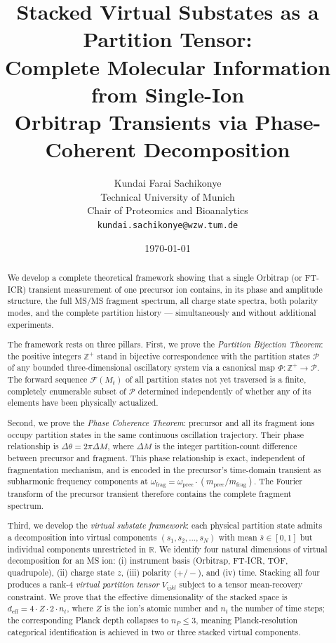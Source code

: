 \documentclass[twocolumn,10pt,a4paper]{article}
\title{\textbf{Stacked Virtual Substates as a Partition Tensor:\\
Complete Molecular Information from Single-Ion\\
Orbitrap Transients via Phase-Coherent Decomposition}}
\author{
Kundai Farai Sachikonye\\
Technical University of Munich\\
Chair of Proteomics and Bioanalytics\\
\texttt{kundai.sachikonye@wzw.tum.de}
}
\date{\today}
\theoremstyle{thmstyle}
\theoremstyle{definition}
\theoremstyle{remark}
\newcommand{\R}{\mathbb{R}}
\newcommand{\Zp}{\mathbb{Z}^{+}}
\newcommand{\Parts}{\mathcal{P}}
\newcommand{\PhiMap}{\varPhi}
\newcommand{\calF}{\mathcal{F}}
\begin{document}
\maketitle

\begin{abstract}
\noindent
We develop a complete theoretical framework showing that a single
Orbitrap (or FT-ICR) transient measurement of one precursor ion
contains, in its phase and amplitude structure, the full MS/MS fragment
spectrum, all charge state spectra, both polarity modes, and the
complete partition history --- simultaneously and without additional
experiments.

The framework rests on three pillars. First, we prove the
\emph{Partition Bijection Theorem}: the positive integers $\Zp$ stand
in bijective correspondence with the partition states $\Parts$ of any
bounded three-dimensional oscillatory system via a canonical map
$\PhiMap: \Zp \to \Parts$. The forward sequence $\calF(M_t)$ of all
partition states not yet traversed is a finite, completely enumerable
subset of $\Parts$ determined independently of whether any of its
elements have been physically actualized.

Second, we prove the \emph{Phase Coherence Theorem}: precursor and all
its fragment ions occupy partition states in the same continuous
oscillation trajectory. Their phase relationship is $\Delta\theta =
2\pi\Delta M$, where $\Delta M$ is the integer partition-count
difference between precursor and fragment. This phase relationship is
exact, independent of fragmentation mechanism, and is encoded in the
precursor's time-domain transient as subharmonic frequency components
at $\omega_{\mathrm{frag}} = \omega_{\mathrm{prec}} \cdot
(m_{\mathrm{prec}}/m_{\mathrm{frag}})$. The Fourier transform of the
precursor transient therefore contains the complete fragment spectrum.

Third, we develop the \emph{virtual substate framework}: each physical
partition state admits a decomposition into virtual components
$(s_1, s_2, \ldots, s_N)$ with mean $\bar{s} \in [0,1]$ but individual
components unrestricted in $\R$. We identify four natural dimensions of
virtual decomposition for an MS ion: (i) instrument basis (Orbitrap,
FT-ICR, TOF, quadrupole), (ii) charge state $z$, (iii) polarity
($+/-$), and (iv) time. Stacking all four produces a rank-4
\emph{virtual partition tensor} $V_{ijkl}$ subject to a tensor
mean-recovery constraint. We prove that the effective dimensionality of
the stacked space is $d_{\mathrm{eff}} = 4 \cdot Z \cdot 2 \cdot n_t$,
where $Z$ is the ion's atomic number and $n_t$ the number of time steps;
the corresponding Planck depth collapses to $n_P \leq 3$, meaning
Planck-resolution categorical identification is achieved in two or
three stacked virtual components.


\end{abstract}
\end{document}
